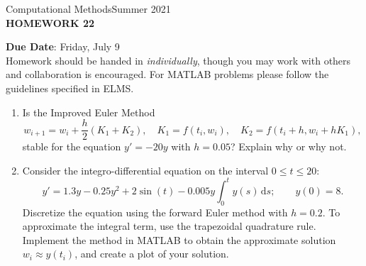\documentclass[12pt]{article}
\begin{document}
\begin{center}
Computational Methods\qquad Summer 2021
\\

\textbf{\large HOMEWORK 22}\\
\end{center}
\noindent \textbf{Due Date}: Friday, July 9\\

\noindent Homework should be handed in \emph{individually}, though you may work with others and collaboration is encouraged. For MATLAB problems please follow the guidelines specified in ELMS.

\begin{enumerate}
\item Is the Improved Euler Method 
	\[w_{i+1}=w_i + \frac{h}{2}(K_1+K_2),\quad K_1=f(t_i,w_i),\quad K_2 = f(t_i+h,w_i+hK_1),\]
stable for the equation $y'=-20y$ with $h=0.05$? Explain why or why not.
\item Consider the integro-differential equation on the interval $0\le t\le 20$:
	\[y'=1.3y - 0.25y^2 + 2\sin(t) - 0.005y\int_0^t\! y(s) \,\mathrm{d}s;\qquad y(0)=8.\]
Discretize the equation using the forward Euler method with $h=0.2$. To approximate the integral term, use the trapezoidal quadrature rule. Implement the method in MATLAB to obtain the approximate solution $w_i\approx y(t_i)$, and create a plot of your solution.
    

\end{enumerate}
\end{document}
